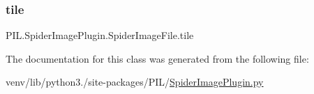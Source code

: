 \mbox{\label{classPIL_1_1SpiderImagePlugin_1_1SpiderImageFile_ac82184905f329091fc057ba9408574ca}} 
\subsubsection{\texorpdfstring{tile}{tile}}
{\footnotesize\ttfamily P\+I\+L.\+Spider\+Image\+Plugin.\+Spider\+Image\+File.\+tile}



The documentation for this class was generated from the following file\+:\begin{DoxyCompactItemize}
\item 
venv/lib/python3./site-\/packages/\+P\+I\+L/\hyperlink{SpiderImagePlugin_8py}{Spider\+Image\+Plugin.\+py}\end{DoxyCompactItemize}
